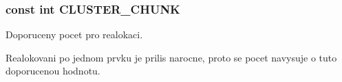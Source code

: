 \subsubsection[{\texorpdfstring{C\+L\+U\+S\+T\+E\+R\+\_\+\+C\+H\+U\+NK}{CLUSTER_CHUNK}}]{\setlength{\rightskip}{0pt plus 5cm}const int C\+L\+U\+S\+T\+E\+R\+\_\+\+C\+H\+U\+NK}\hypertarget{group__ZmenaKapacity_gafb09f2bf4615f5ac7a91807aa086d4c3}{}\label{group__ZmenaKapacity_gafb09f2bf4615f5ac7a91807aa086d4c3}


Doporuceny pocet pro realokaci. 

Realokovani po jednom prvku je prilis narocne, proto se pocet navysuje o tuto doporucenou hodnotu. 